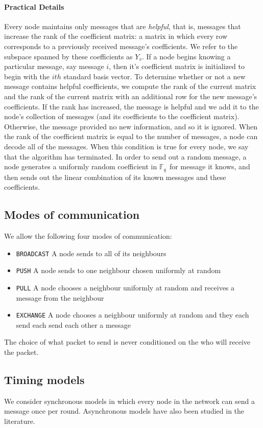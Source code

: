 \documentclass{article} %
\def\fieldSize{\textit{q}\,}
\begin{document}
\paragraph{Practical Details}
Every node maintains only messages that are \textit{helpful}, that is, messages that increase the rank of the coefficient matrix: a matrix in which every row corresponds to a previously received message's coefficients. We refer to the subspace spanned by these coefficients as $Y_v$. If a node begins knowing a particular message, say message $i$, then it's coefficient matrix is initialized to begin with the $ith$ standard basis vector. To determine whether or not a new message contains helpful coefficients, we compute the rank of the current matrix and the rank of the current matrix with an additional row for the new message's coefficients. If the rank has increased, the message is helpful and we add it to the node's collection of messages (and its coefficients to the coefficient matrix). Otherwise, the message provided no new information, and so it is ignored. When the rank of the coefficient matrix is equal to the number of messages, a node can decode all of the messages. When this condition is true for every node, we say that the algorithm has terminated. In order to send out a random message, a node generates a uniformly random coefficient in $\mathbb{F}_{\fieldSize}$ for message it knows, and then sends out the linear combination of its known messages and these coefficients.

\subsection{Modes of communication}\label{subsec:communication}
We allow the following four modes of communication:
\begin{itemize}
\item \texttt{BROADCAST} A node sends to all of its neighbours
\item \texttt{PUSH} A node sends to one neighbour chosen uniformly at random
\item \texttt{PULL} A node chooses a neighbour uniformly at random and receives a message from the neighbour
\item \texttt{EXCHANGE} A node chooses a neighbour uniformly at random and they each send each send each other a message
\end{itemize}
The choice of what packet to send is never conditioned on the who will receive the packet.

\subsection{Timing models}
We consider synchronous models in which every node in the network can send a message once per round. Asynchronous models have also been studied in the literature.
\end{document}
